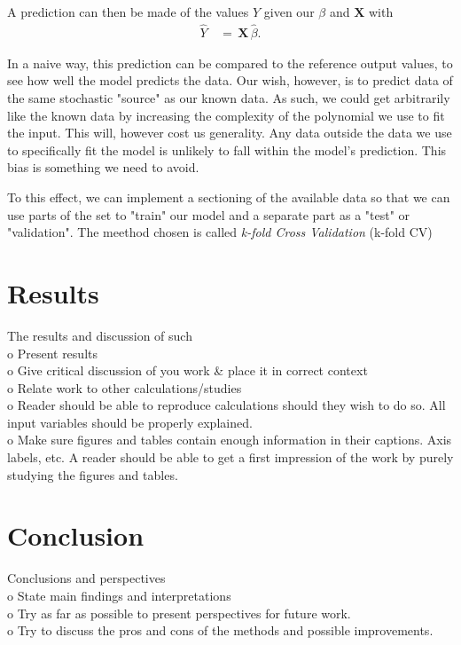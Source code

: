 \documentclass[ 12pt, a4paper ]{article}
\begin{document}
A prediction can then be made of the values $Y$ given our $\beta$ and $\mathbf{X}$ with
\begin{align}
    \hat{Y} \,&=\, \mathbf{X}\,\hat{\beta}.
\end{align}

In a naive way, this prediction can be compared to the reference output values, to see how
well the model predicts the data. Our wish, however, is to predict data of the same stochastic
"source" as our known data. As such, we could get arbitrarily like the known data by 
increasing the complexity of the polynomial we use to fit the input. This will, however cost us
generality. Any data outside the data we use to specifically fit the model is unlikely to fall 
within the model's prediction. This bias is something we need to avoid.

To this effect, we can implement a sectioning of the available data so that we can use parts of
the set to "train" our model and a separate part as a "test" or "validation".
The meethod chosen is called \textit{k-fold Cross Validation} (k-fold CV)

\section{Results}
    The results and discussion of such\\
    o   Present results \\
    o   Give critical discussion of you work \& place it in correct context\\
    o   Relate work to other calculations/studies\\
    o   Reader should be able to reproduce calculations should they wish to do so. 
        All input variables should be properly explained. \\
    o   Make sure figures and tables contain enough information in their captions. 
        Axis labels, etc. A reader should be able to get a first impression of the work
        by purely studying the figures and tables. \\
\section{Conclusion}
    Conclusions and perspectives\\
    o   State main findings and interpretations \\
    o   Try as far as possible to present perspectives for future work. \\
    o   Try to discuss the pros and cons of the methods and possible improvements. \\
\end{document}
